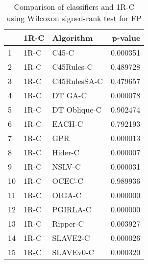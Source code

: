 \begin{table}
\footnotesize
\caption{Comparison of classifiers and 1R-C using Wilcoxon signed-rank test for FP}
\label{tab:1R-C wilcoxon FP comparison}
\begin{tabular}{lllr}
\hline
 & 1R-C & Algorithm & p-value \\
\hline
1 & 1R-C & C45-C & 0.000351 \\
2 & 1R-C & C45Rules-C & 0.489728 \\
3 & 1R-C & C45RulesSA-C & 0.479657 \\
4 & 1R-C & DT GA-C & 0.000078 \\
5 & 1R-C & DT Oblique-C & 0.902474 \\
6 & 1R-C & EACH-C & 0.792193 \\
7 & 1R-C & GPR & 0.000013 \\
8 & 1R-C & Hider-C & 0.000007 \\
9 & 1R-C & NSLV-C & 0.000031 \\
10 & 1R-C & OCEC-C & 0.989936 \\
11 & 1R-C & OIGA-C & 0.000000 \\
12 & 1R-C & PGIRLA-C & 0.000000 \\
13 & 1R-C & Ripper-C & 0.003927 \\
14 & 1R-C & SLAVE2-C & 0.000026 \\
15 & 1R-C & SLAVEv0-C & 0.000320 \\
\hline
\end{tabular}
\end{table}
